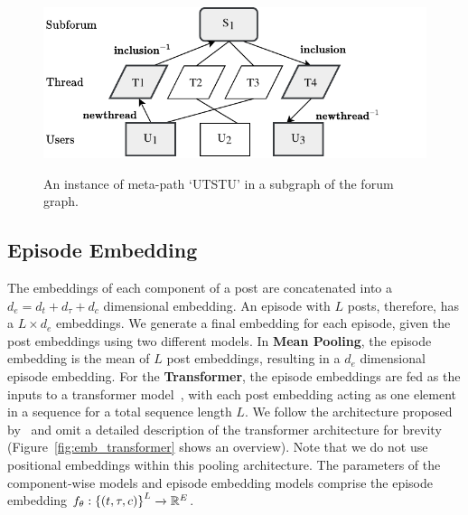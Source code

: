 \begin{figure}
    \centering
    \includegraphics[width=\linewidth,alt={A meta subgraph of the forum graph showing the meta-path UTSTU.}]{sysml/figures/metapathExample.pdf}
    \caption{An instance of meta-path ‘UTSTU’ in a subgraph of the forum graph.}
    \label{fig:metapath}
\end{figure}

\subsection{Episode Embedding}
The embeddings of each component of a post are concatenated into a $d_e = d_t + d_{\tau} + d_c$ dimensional embedding.
An episode with $L$ posts, therefore, has a $L \times d_e$ embeddings. 
We generate a final embedding for each episode, given the post embeddings using two different models.
In \textbf{Mean Pooling}, the episode embedding is the mean of $L$ post embeddings, resulting in a $d_e$ dimensional episode embedding.
For the \textbf{Transformer}, the episode embeddings are fed as the inputs to a transformer model~\cite{devlin2019bert,vaswani2017attention}, with each post embedding acting as one element in a sequence for a total sequence length $L$. 
We follow the architecture proposed by~\citet{andrews2019learning} and omit a detailed description of the transformer architecture for brevity (Figure~\ref{fig:emb_transformer} shows an overview).
Note that we do not use positional embeddings within this pooling architecture.
The parameters of the component-wise models and episode embedding models comprise the episode embedding $f_{\theta}: \left\{(t, \tau, c)\right\}^L \xrightarrow[]{} \mathbb{R} ^ E$.

